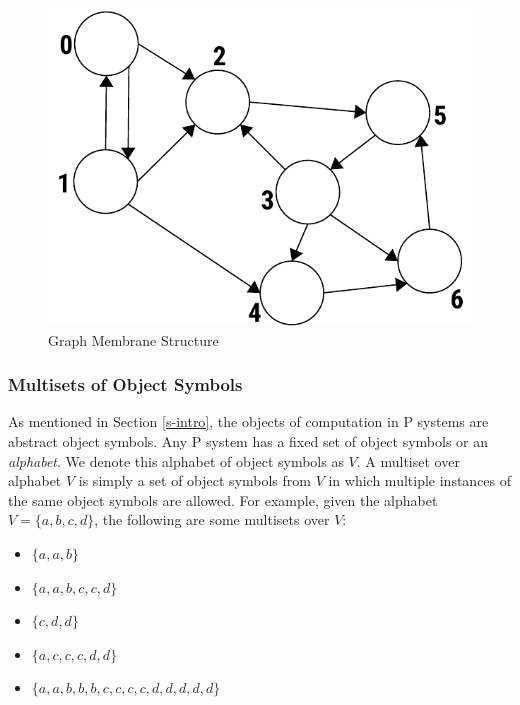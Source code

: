 \documentclass{article}
\begin{document}
\begin{figure}[H]
\begin{center}
\includegraphics[scale=0.60]{figures/zzz-graph-topology.pdf}
\caption{Graph Membrane Structure}
\label{fig:graph-topology}
\end{center}
\end{figure}


\subsubsection{Multisets of Object Symbols}\label{s-multiset}

As mentioned in Section \ref{s-intro}, the objects of computation in P systems are abstract
object symbols. Any P system has a fixed set of object symbols or an \textit{alphabet}. We denote 
this alphabet of object symbols as $V$. A multiset over alphabet $V$ is simply a set of object 
symbols from $V$ in which multiple instances of the same object symbols are allowed. For example, 
given the alphabet $V = \{a,b,c,d\}$, the following are some multisets over $V$:

\begin{itemize}
\item $\{a,a,b\}$
\item $\{a,a,b,c,c,d\}$
\item $\{c,d,d\}$
\item $\{a,c,c,c,d,d\}$
\item $\{a,a,b,b,b,c,c,c,c,d,d,d,d,d\}$
\end{itemize}
\end{document}
